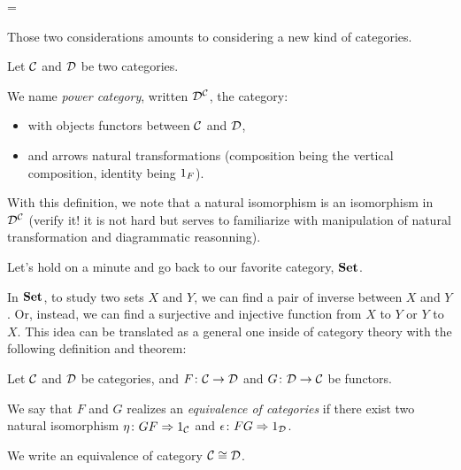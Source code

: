 \documentclass[a4paper]{article}
\theoremstyle { remark }
\theoremstyle { definition }
\newtheorem { definition } { Definition }
\theoremstyle { plain }
\begin{document}
\begin{center}
= 
\end{center}

Those two considerations amounts to considering a new kind of categories.

\begin{definition}
Let \(  \mathcal { C }  \) and \(  \mathcal { D }  \) be two categories.

We name \emph{power category}, written \(  \mathcal { D } ^ \mathcal { C }  \), the category:
\begin{itemize}
  \item with objects functors between \(  \mathcal { C }  \) and \(  \mathcal { D }  \),
  \item and arrows natural transformations (composition being the vertical composition, identity being \( \one[F] \)).
\end{itemize}
\end{definition}

\noindent With this definition, we note that a natural isomorphism is an isomorphism in \(  \mathcal { D } ^ \mathcal { C }  \) (verify it! it is not hard but serves to familiarize with manipulation of natural transformation and diagrammatic reasonning).

Let's hold on a minute and go back to our favorite category, \(  \mathbf { Set }  \).

In \(  \mathbf { Set }  \), to study two sets \( X \) and \( Y \), we can find a pair of inverse between \( X \) and \( Y \).
Or, instead, we can find a surjective and injective function from \( X \) to \( Y \) or \( Y \) to \( X \).
This idea can be translated as a general one inside of category theory with the following definition and theorem:

\begin{definition}
Let \(  \mathcal { C }  \) and \(  \mathcal { D }  \) be categories, and \( F \colon  \mathcal { C }  \to  \mathcal { D }  \) and \( G \colon  \mathcal { D }  \to  \mathcal { C }  \) be functors.

We say that \( F \) and \( G \) realizes an \emph{equivalence of categories} if there exist two natural isomorphism \( \eta \colon G F \Rightarrow \one[\C] \) and \( \epsilon \colon F G \Rightarrow \one[\D] \).

We write an equivalence of category \(  \mathcal { C }  \cong  \mathcal { D }  \).
\end{definition}
\end{document}
